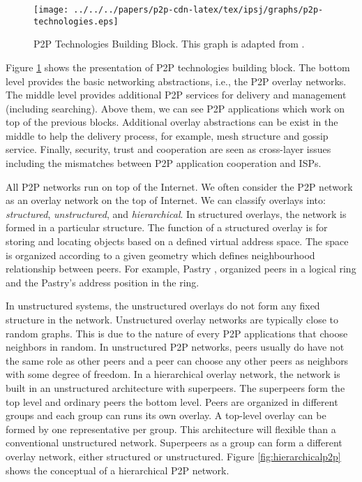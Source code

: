 \begin{figure}[tb]
\begin{center}
\texttt{[image: ../../../papers/p2p-cdn-latex/tex/ipsj/graphs/p2p-technologies.eps]}
\end{center}
\caption{P2P Technologies Building Block. This graph is adapted from \cite{Passarella20121}.} 
\label{fig:p2ptech}
\end{figure}

Figure \ref{fig:p2ptech} shows the presentation of P2P technologies building block.
The bottom level provides the basic networking abstractions, i.e., the P2P overlay networks. 
The middle level provides additional P2P services for delivery and management (including searching).
Above them, we can see P2P applications which work on top of the previous blocks.
Additional overlay abstractions can be exist in the middle to help the delivery process, for example,  mesh structure and gossip service.
Finally, security, trust and cooperation are seen as cross-layer issues including the mismatches between P2P application cooperation and ISPs.

All P2P networks run on top of the Internet. 
We often consider the P2P network as an overlay network on the top of Internet. 
We can classify overlays into: \emph{structured}, \emph{unstructured}, and \emph{hierarchical}. 
In structured overlays, the network is formed in a particular structure. 
The function of a structured overlay is for storing and locating objects based on a defined virtual address space. 
The space is organized according to a given geometry which defines neighbourhood relationship between peers.
For example, Pastry \cite{Rowstron:2001:PSD:646591.697650}, organized peers in a logical ring and the Pastry's address position in the ring. 

In unstructured systems, the unstructured overlays do not form any fixed structure in the network. 
Unstructured overlay networks are typically close to random graphs. 
This is due to the nature of every P2P applications that choose neighbors in random.
In unstructured P2P networks, peers usually do have not the same role as other peers and a peer can choose any other peers as neighbors with some degree of freedom.  
In a hierarchical overlay network, the network is built in an unstructured architecture with superpeers.
The superpeers form the top level and ordinary peers the bottom level.
Peers are organized in different groups and each group can runs its own overlay. 
A top-level overlay can be formed by one representative per group.
This architecture will flexible than a conventional unstructured network. 
Superpeers as a group can form a different overlay network, either structured or unstructured. 
Figure \ref{fig:hierarchicalp2p} shows the conceptual of a hierarchical P2P network. 

